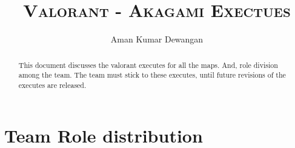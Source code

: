 \documentclass[letterpaper,11pt]{article}
\title{\textbf{\LARGE \scshape Valorant - Akagami Exectues}}
\author{Aman Kumar Dewangan}
\begin{document}
\maketitle

\begin{abstract}
This document discusses the valorant executes for all the maps. And, role division among the team. The team must stick to these executes, until future revisions of the executes are released.
\end{abstract}

\clearpage


\thispagestyle{plain}
\tableofcontents
\clearpage





\section{\textbf{Team Role distribution}}
\end{document}
